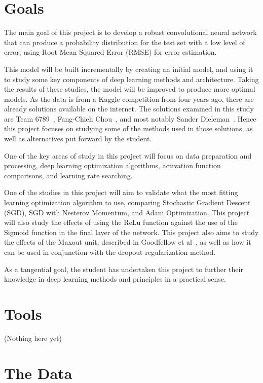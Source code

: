 \documentclass[12pt,a4paper,oneside,oldfontcommands]{memoir}
\begin{document}
\section{Goals}

The main goal of this project is to develop a robust convolutional neural network that can produce a probability distribution for the test set with a low level of error, using Root Mean Squared Error (RMSE) for error estimation.

This model will be built incrementally by creating an initial model, and using it to study some key components of deep learning methods and architecture. Taking the results of these studies, the model will be improved to produce more optimal models. As the data is from a Kaggle competition from four years ago, there are already solutions available on the internet. The solutions examined in this study are Team 6789~\cite{Nguyen}, Fang-Chieh Chou~\cite{Fang}, and most notably Sander Dieleman~\cite{Sanders-GZ}. Hence this project focuses on studying some of the methods used in those solutions, as well as alternatives put forward by the student.

One of the key areas of study in this project will focus on data preparation and processing, deep learning optimization algorithms, activation function comparisons, and learning rate searching.

One of the studies in this project will aim to validate what the most fitting learning optimization algorithm to use, comparing Stochastic Gradient Descent (SGD), SGD with Nesterov Momentum, and Adam Optimization. This project will also study the effects of using the ReLu function against the use of the Sigmoid function in the final layer of the network. This project also aims to study the effects of the Maxout unit, described in Goodfellow et al~\cite{maxout}, as well as how it can be used in conjunction with the dropout regularization method.

As a tangential goal, the student has undertaken this project to further their knowledge in deep learning methods and principles in a practical sense.

\section{Tools}

(Nothing here yet)

\section{The Data}
\end{document}
